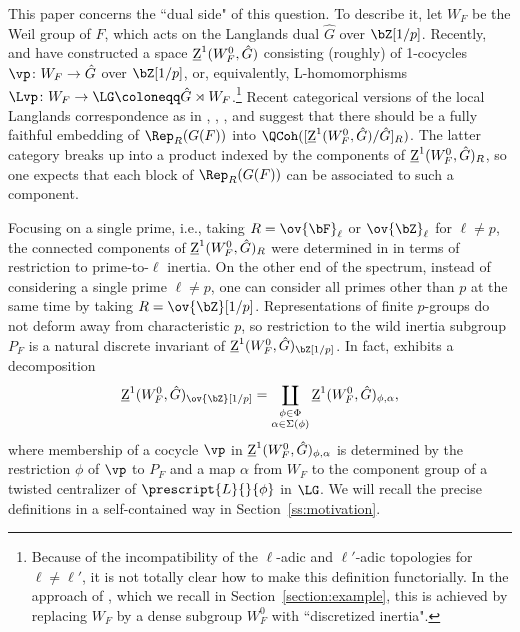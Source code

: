 This paper concerns the ``dual side" of this question. To describe it, let $W_F$ be the Weil group of $F$, which acts on the Langlands dual $\hat{G}$ over $\bZ[1/p]$. Recently, \cite{DHKM} and \cite{Zhu} have constructed a space $\underline{\rm{Z}}^1(W_F^0, \hat{G})$ consisting (roughly) of 1-cocycles $\vp\colon W_F \to \hat{G}$ over $\bZ[1/p]$, or, equivalently, L-homomorphisms $\Lvp\colon W_F \to \LG \coloneqq \hat{G} \rtimes W_F$.\footnote{Because of the incompatibility of the $\ell$-adic and $\ell'$-adic topologies for $\ell \neq \ell'$, it is not totally clear how to make this definition functorially. In the approach of \cite{DHKM}, which we recall in Section~\ref{section:example}, this is achieved by replacing $W_F$ by a dense subgroup $W_F^0$ with ``discretized inertia".} Recent categorical versions of the local Langlands correspondence as in \cite{Hellmann}, \cite{BZCHN}, \cite{Zhu}, and \cite{Fargues-Scholze} suggest that there should be a fully faithful embedding of $\Rep_R(G(F))$ into $\QCoh([\underline{\rm{Z}}^1(W_F^0, \hat{G})/\hat{G}]_R)$. The latter category breaks up into a product indexed by the components of $\underline{\rm{Z}}^1(W_F^0, \hat{G})_R$, so one expects that each block of $\Rep_R(G(F))$ can be associated to such a component.\smallskip

Focusing on a single prime, i.e., taking $R = \ov{\bF}_\ell$ or $\ov{\bZ}_\ell$ for $\ell \neq p$, the connected components of $\underline{\rm{Z}}^1(W_F^0, \hat{G})_R$ were determined in \cite[4.8]{DHKM} in terms of restriction to prime-to-$\ell$ inertia. On the other end of the spectrum, instead of considering a single prime $\ell \neq p$, one can consider all primes other than $p$ at the same time by taking $R = \ov{\bZ}[1/p]$. Representations of finite $p$-groups do not deform away from characteristic $p$, so restriction to the wild inertia subgroup $P_F$ is a natural discrete invariant of $\underline{\rm{Z}}^1(W_F^0, \hat{G})_{\bZ[1/p]}$. In fact, \cite[\S 4.1]{DHKM} exhibits a decomposition
\begin{equation}\label{eqn:z-1/p-decomp}
\underline{\rm{Z}}^1(W_F^0, \hat{G})_{\ov{\bZ}[1/p]} = \coprod_{\substack{\phi \in \Phi \\ \alpha \in \Sigma(\phi)}} \underline{\rm{Z}}^1(W_F^0, \hat{G})_{\phi, \alpha},
\end{equation}
where membership of a cocycle $\vp$ in $\underline{\rm{Z}}^1(W_F^0, \hat{G})_{\phi, \alpha}$ is determined by the restriction $\phi$ of $\vp$ to $P_F$ and a map $\alpha$ from $W_F$ to the component group of a twisted centralizer of $\prescript{L}{}{\phi}$ in $\LG$. We will recall the precise definitions in a self-contained way in Section~\ref{ss:motivation}.

